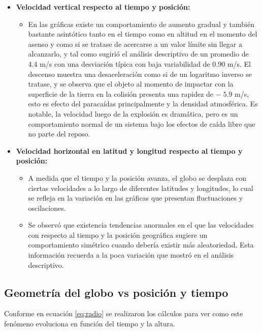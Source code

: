 \begin{itemize}
    \item \textbf{Velocidad vertical respecto al tiempo y posición:}     
        \begin{itemize}
            \item En las gráficas  existe un comportamiento de aumento gradual y también bastante asintótico tanto en el tiempo como en altitud en el momento del asenso y como si se tratase de acercarse a un valor límite sin llegar a alcanzarlo, y tal como sugirió el análisis descriptivo de un promedio de 4.4 m/s con una desviación típica con baja variabilidad de 0.90 m/s. El descenso muestra una desaceleración como si de un logaritmo inverso se tratase, y se observa que el objeto al momento de impactar con la superficie de la tierra en la colisión presenta una rapidez  de  $- \;  5.9$  m/s, esto es efecto del paracaídas principalmente y la densidad atmosférica. Es notable, la velocidad luego de la explosión es dramática, pero es un comportamiento normal de un sistema bajo los efectos de caída libre que no parte del reposo.
        \end{itemize}

    \item \textbf{Velocidad horizontal en latitud y longitud respecto al tiempo y posición:}
    \begin{itemize}         
        \item A medida que el tiempo y la posición avanza, el globo se desplaza con ciertas velocidades a lo largo de diferentes latitudes y longitudes, lo cual se refleja en la variación en las gráficas que presentan fluctuaciones y oscilaciones. 
        \item Se observó que existencia tendencias anormales en el que las velocidades con respecto al tiempo y la posición geográfica sugiere un comportamiento simétrico cuando debería existir más aleatoriedad. Esta información recuerda a la poca variación que mostró en el análisis descriptivo.  
    \end{itemize}

\end{itemize}
\normalsize

\newpage

\subsection{Geometría del globo vs posición y tiempo}

Conforme en ecuación \ref{eq:radio} se realizaron los cálculos para ver como este fenómeno evoluciona en función del tiempo y la altura. 

